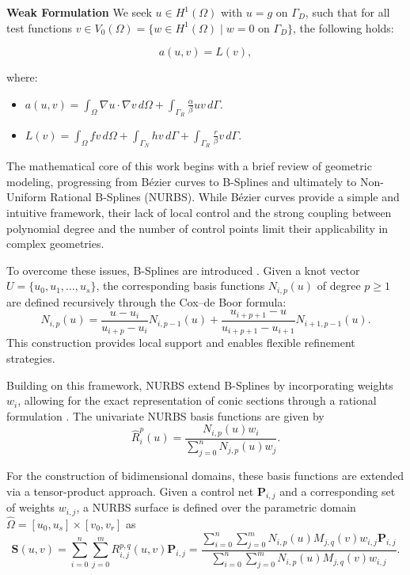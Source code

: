 \documentclass[11pt]{book}
\theoremstyle{plain} %
\theoremstyle{definition} %
\theoremstyle{definition} %
\begin{document}
\textbf{Weak Formulation}
We seek $u \in H^1(\Omega)$ with $ u=g \text{ on } \Gamma_D$, such that for all test functions $v \in V_0(\Omega)=\{w \in H^1(\Omega) \mid w=0 \text{ on } \Gamma_D\}$, the following holds:

\begin{equation}
    a(u,v)=L(v),
\end{equation}

where:

\begin{itemize}
    \item ${a(u,v)}=\int_{\Omega}\nabla u \cdot \nabla v\, d\Omega + \int_{\Gamma_R}\frac{\alpha}{\beta}uv\, d\Gamma$.\vspace{-0.1cm}
    \item ${L(v)}=\int_{\Omega}fv \, d\Omega+\int_{\Gamma_N}hv\, d\Gamma+\int_{\Gamma_R}\frac{r}{\beta}v\, d\Gamma$.
\end{itemize}

The mathematical core of this work begins with a brief review of geometric modeling, progressing from Bézier curves to B-Splines and ultimately to Non-Uniform Rational B-Splines (NURBS). While Bézier curves provide a simple and intuitive framework, their lack of local control and the strong coupling between polynomial degree and the number of control points limit their applicability in complex geometries.

To overcome these issues, B-Splines are introduced \cite{farin_curves_2002}. Given a knot vector $U = \{u_0, u_1, \ldots, u_s\}$, the corresponding basis functions $N_{i,p}(u)$ of degree $p \ge 1$ are defined recursively through the Cox--de Boor formula:
\begin{equation*}
    N_{i,p}(u) = \frac{u - u_i}{u_{i+p} - u_i} N_{i,p-1}(u) + \frac{u_{i+p+1} - u}{u_{i+p+1} - u_{i+1}} N_{i+1,p-1}(u).
\end{equation*}
This construction provides local support and enables flexible refinement strategies.

Building on this framework, NURBS extend B-Splines by incorporating weights $w_i$, allowing for the exact representation of conic sections through a rational formulation \cite{piegl_nurbs_2012}. The univariate NURBS basis functions are given by
\begin{equation*}
    \hat{R}_i^p(u)=\frac{N_{i,p}(u) w_i}{\sum_{j=0}^{n} N_{j,p}(u) w_j}.
\end{equation*}

For the construction of bidimensional domains, these basis functions are extended via a tensor-product approach. Given a control net $\mathbf{P}_{i,j}$ and a corresponding set of weights $w_{i,j}$, a NURBS surface is defined over the parametric domain $\hat{\Omega} = [u_0, u_s] \times [v_0, v_r]$ as
\begin{equation*}
    \mathbf{S}(u, v) = \sum_{i=0}^{n} \sum_{j=0}^{m} R_{i,j}^{p,q}(u, v) \mathbf{P}_{i,j}
    = \frac{\sum_{i=0}^{n} \sum_{j=0}^{m} N_{i,p}(u) M_{j,q}(v) w_{i,j} \mathbf{P}_{i,j}}{\sum_{i=0}^{n} \sum_{j=0}^{m} N_{i,p}(u) M_{j,q}(v) w_{i,j}}.
\end{equation*}
\end{document}
